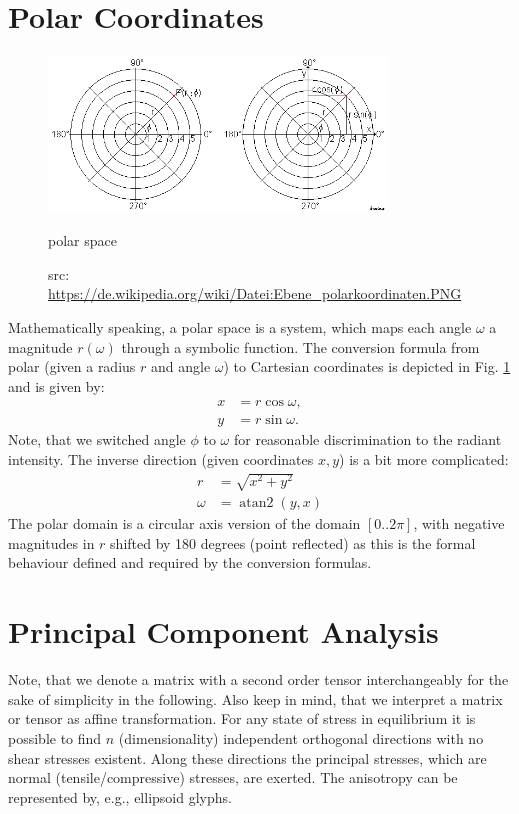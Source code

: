 \documentclass{scrartcl}
\begin{document}
\section{Polar Coordinates}
\label{sec:polar}
\begin{figure}[!t]
  \centering
 {
    \includegraphics[width=0.8\textwidth]
    {img/polarkoordinaten.png}
  }
  \caption{polar space}
   \caption*{src: \url{https://de.wikipedia.org/wiki/Datei:Ebene_polarkoordinaten.PNG}}
  \label{polar}
\end{figure}\vskip 3pt
Mathematically speaking, a polar space is a system, which maps each angle $\omega$ a magnitude $r(\omega)$ through a symbolic function. The conversion formula from polar (given a radius $r$ and angle $\omega$) to Cartesian coordinates is depicted in Fig. \ref{polar} and is given by:
\begin{align*}
	x &= r \cos \omega, \\
 	y &= r \sin \omega.
\end{align*}
Note, that we switched angle $\phi$ to $\omega$ for reasonable discrimination to the radiant intensity. The inverse direction (given coordinates $x,y$) is a bit more complicated:
\begin{align*}
	r &= \sqrt{x^2 + y^2} \\
\omega &= \operatorname{atan2}(y, x)
\end{align*}
The polar domain is a circular axis version of the domain $[0..2\pi]$, with negative magnitudes in $r$ shifted by 180 degrees (point reflected) as this is the formal behaviour defined and required by the conversion formulas.

\section{Principal Component Analysis}
\label{sec:pca}
Note, that we denote a matrix with a second order tensor interchangeably for the sake of simplicity in the following. Also keep in mind, that we interpret a matrix or tensor as affine transformation. For any state of stress in equilibrium it is possible to find $n$ (dimensionality) independent orthogonal directions with no shear stresses existent. Along these directions the principal stresses, which are normal (tensile/compressive) stresses, are exerted. The anisotropy can be represented by, e.g., ellipsoid glyphs.
\end{document}
